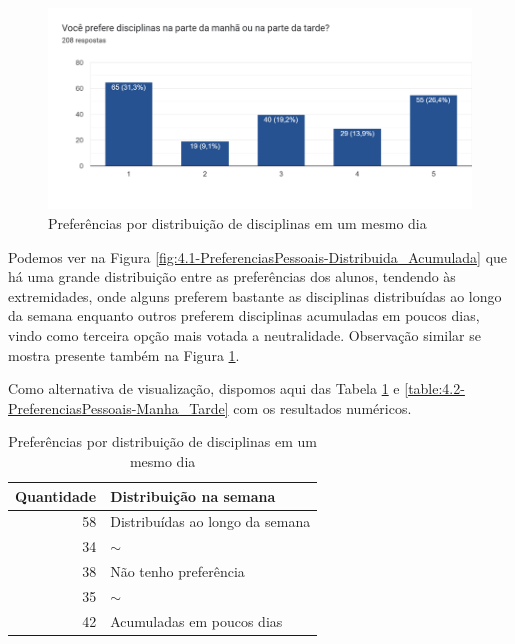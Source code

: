 \begin{figure}[htbp]\centering
  \caption{\label{fig:4.2-PreferenciasPessoais-Manha_Tarde}Preferências por distribuição de disciplinas em um mesmo dia}
  \includegraphics[scale=0.6]{files/img/Forms/4.2-PreferenciasPessoais-Manha_Tarde.png}
\end{figure} %

Podemos ver na Figura \ref{fig:4.1-PreferenciasPessoais-Distribuida_Acumulada} que há uma grande distribuição entre as preferências dos alunos, tendendo às extremidades, onde alguns preferem bastante as disciplinas distribuídas ao longo da semana enquanto outros preferem disciplinas acumuladas em poucos dias, vindo como terceira opção mais votada a neutralidade. Observação similar se mostra presente também na Figura \ref{fig:4.2-PreferenciasPessoais-Manha_Tarde}.

Como alternativa de visualização, dispomos aqui das Tabela \ref{table:4.1-PreferenciasPessoais-Distribuída_Acumulada} e \ref{table:4.2-PreferenciasPessoais-Manha_Tarde} com os resultados numéricos.

\begin{table}[htbp]
  \centering
  \caption{\label{table:4.1-PreferenciasPessoais-Distribuída_Acumulada}Preferências por distribuição de disciplinas em um mesmo dia}
  \begin{tabular}{| r l |}
    \hline
    \textbf{Quantidade} & \textbf{Distribuição na semana} \\
    \hline
    58                  & Distribuídas ao longo da semana \\
    34                  & $\sim$                          \\
    38                  & Não tenho preferência           \\
    35                  & $\sim$                          \\
    42                  & Acumuladas em poucos dias       \\
    \hline
  \end{tabular}
\end{table}

